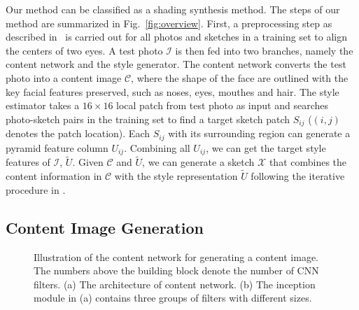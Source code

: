 \documentclass[10pt,twocolumn,letterpaper]{article}
\begin{document}
Our method can be classified as a shading synthesis method. The steps of our method are summarized in Fig.~\ref{fig:overview}. First, a preprocessing step as described in~\cite{wang2009face} is carried out for all photos and sketches in a training set to align the centers of two eyes. A test photo $\mathcal{I}$ is then fed into two branches, namely the content network and the style generator. The content network converts the test photo into a content image $\mathcal{C}$, where the shape of the face are outlined with the key facial features preserved, such as noses, eyes, mouthes and hair. The style estimator takes a $16\times16$ local patch from test photo as input and searches photo-sketch pairs in the training set to find a target sketch patch $S_{ij}$ ($(i, j)$ denotes the patch location). Each  $S_{ij}$ with its surrounding region can generate a pyramid feature column $U_{ij}$. Combining all $U_{ij}$, we can get the target style features of $\mathcal{I}$, \ie $\tilde{U}$. Given $\mathcal{C}$ and $\tilde{U}$, we can generate a sketch $\mathcal{X}$ that combines the content information in $\mathcal{C}$ with the style representation $\tilde{U}$ following the iterative procedure in \cite{gatys2015neural}. 

\subsection{Content Image Generation}
\begin{figure}[htbp]
\centering
{}
\caption{Illustration of the content network for generating a content image. The numbers above the building block denote the number of CNN filters. (a) The architecture of content network. (b) The inception module in (a) contains three groups of filters with different sizes.}
\label{fig:content_NN}
\end{figure}
\end{document}
